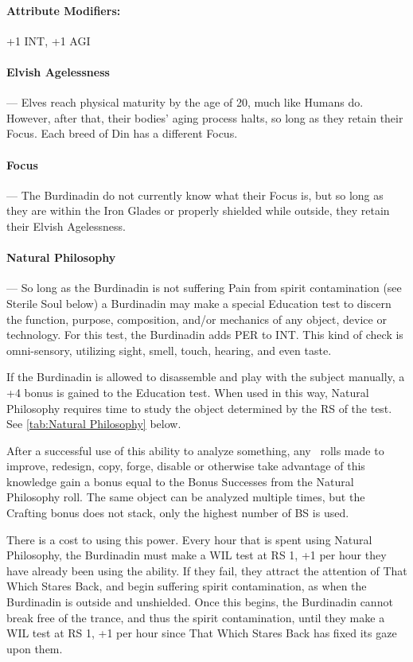 \documentclass[oneside,11pt,english]{book}
\begin{document}
\paragraph{Attribute Modifiers:} +1 INT, +1 AGI 

\paragraph{Elvish Agelessness}---\quad
Elves reach physical maturity by the age of 20, much like Humans do. However, after that, their 
bodies' aging process halts, so long as they retain their Focus. Each breed of Din has a different Focus. 

\paragraph{Focus}---\quad
The Burdinadin do not currently know what their Focus is, but so long as they are within the Iron 
Glades or properly shielded while outside, they retain their Elvish Agelessness. 

\paragraph{Natural Philosophy}---\quad
So long as the Burdinadin is not suffering Pain from spirit contamination (see Sterile Soul below) 
a Burdinadin may make a special Education test to discern the function, purpose, composition, 
and/or mechanics of any object, device or technology. For this test, the Burdinadin adds PER to 
INT. This kind of check is omni-sensory, utilizing sight, smell, touch, hearing, and even taste.

If the Burdinadin is allowed to disassemble and play with the subject manually, a +4 bonus is gained to the Education test. %
When used in this way, Natural Philosophy requires time to study the object determined by the RS of the test. See \autoref{tab:Natural Philosophy} below.

After a successful use of this ability to analyze something, any ~rolls made to improve, redesign, copy, forge, disable or otherwise take advantage of this knowledge gain a bonus equal 
to the Bonus Successes from the Natural Philosophy roll. The same object can be analyzed 
multiple times, but the Crafting bonus does not stack, only the highest number of BS is used. 

There is a cost to using this power. Every hour that is spent using Natural Philosophy, the 
Burdinadin must make a WIL test at RS 1, +1 per hour they have already been using the ability. If 
they fail, they attract the attention of That Which Stares Back, and begin suffering spirit 
contamination, as when the Burdinadin is outside and unshielded. Once this begins, the 
Burdinadin cannot break free of the trance, and thus the spirit contamination, until they make a 
WIL test at RS 1, +1 per hour since That Which Stares Back has fixed its gaze upon them. 
\end{document}
